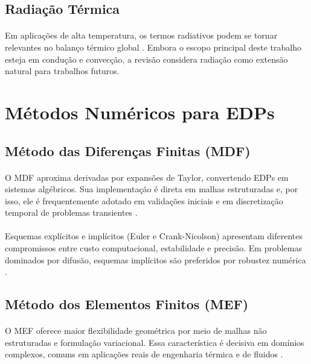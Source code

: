 \subsection{Radiação Térmica}
\paragraph{}Em aplicações de alta temperatura, os termos radiativos podem se tornar relevantes no balanço térmico global \cite{Incropera2008,Cengel2015}. Embora o escopo principal deste trabalho esteja em condução e convecção, a revisão considera radiação como extensão natural para trabalhos futuros.

\section{Métodos Numéricos para EDPs}

\subsection{Método das Diferenças Finitas (MDF)}
\paragraph{}O MDF aproxima derivadas por expansões de Taylor, convertendo EDPs em sistemas algébricos. Sua implementação é direta em malhas estruturadas e, por isso, ele é frequentemente adotado em validações iniciais e em discretização temporal de problemas transientes \cite{Versteeg2007,Patankar1980}.

\paragraph{}Esquemas explícitos e implícitos (Euler e Crank-Nicolson) apresentam diferentes compromissos entre custo computacional, estabilidade e precisão. Em problemas dominados por difusão, esquemas implícitos são preferidos por robustez numérica \cite{Versteeg2007,Maliska2004}.

\subsection{Método dos Elementos Finitos (MEF)}
\paragraph{}O MEF oferece maior flexibilidade geométrica por meio de malhas não estruturadas e formulação variacional. Essa característica é decisiva em domínios complexos, comuns em aplicações reais de engenharia térmica e de fluidos \cite{Fish2007,Lewis2004,Reddy2005,Zienkiewicz2013,Bathe1996,Logan2007,Huebner2001}.

